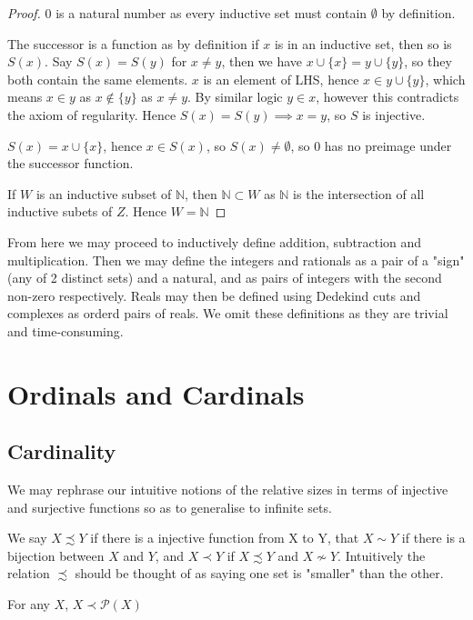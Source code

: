 \documentclass[]{article}
\begin{document}
	\begin{proof}
			$0$ is a natural number as every inductive set must contain $\emptyset$ by definition.

			The successor is a function as by definition if $x$ is in an inductive set, then so is $S(x)$. Say $S(x) = S(y)$ for $x \neq y$, then we have $x \cup \{x\} = y \cup \{y\}$, so they both contain the same elements.  $x$ is an element of LHS, hence $x \in y \cup \{y\}$, which means $x \in y$ as $x \not\in \{y\}$ as $x \neq y$. By similar logic $y \in x$, however this contradicts the axiom of regularity. Hence $S(x) = S(y) \implies x = y$, so $S$ is injective.

			$S(x) = x \cup \{x\}$, hence $x \in S(x)$, so $S(x) \neq \emptyset$, so $0$ has no preimage under the successor function.

			If $W$ is an inductive subset of $\mathbb{N}$, then $\mathbb{N} \subset W$ as $\mathbb{N}$ is the intersection of all inductive subets of $Z$. Hence $W = \mathbb{N}$	
	\end{proof}

	From here we may proceed to inductively define addition, subtraction and multiplication. Then we may define the integers and rationals as a pair of a "sign" (any of 2 distinct sets) and a natural, and as pairs of integers with the second non-zero respectively. Reals may then be defined using Dedekind cuts and complexes as orderd pairs of reals. We omit these definitions as they are trivial and time-consuming.

\section{Ordinals and Cardinals}

\subsection{Cardinality}

We may rephrase our intuitive notions of the relative sizes in terms of injective and surjective functions so as to generalise to infinite sets.

We say $X \precsim Y$ if there is a injective function from X to Y, that $X \sim Y$ if there is a bijection between $X$ and $Y$, and $X \prec Y$ if $X \precsim Y$ and $X \not\sim Y$. Intuitively the relation $\precsim$ should be thought of as saying one set is "smaller" than the other.

\begin{thm}  \label{thm:cantor}
		For any $X$, $X \prec \mathcal{P}(X)$	
\end{thm}
\end{document}
